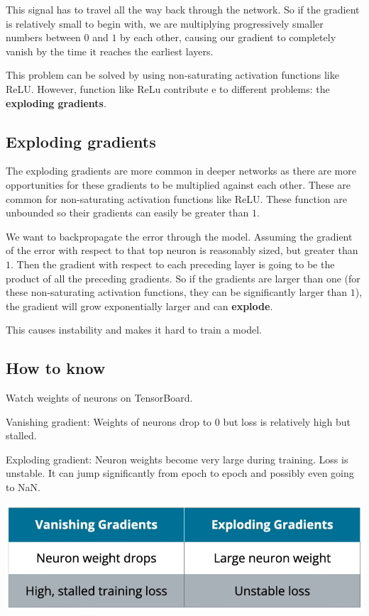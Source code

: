 This signal has to travel all the way back through the network. So if the gradient is relatively small to begin with, we are multiplying progressively smaller numbers between \(0\) and \(1\) by each other, causing our gradient to completely vanish by the time it reaches the earliest layers. 

This problem can be solved by using non-saturating activation functions like ReLU.  However, function like ReLu contribute e to different problems: the \textbf{exploding gradients}.

\subsection{Exploding gradients}
The exploding gradients are more common in deeper networks as there are more opportunities for these gradients to be multiplied against each other. These are common for non-saturating activation functions like ReLU. These function are unbounded so their gradients can easily be greater than \(1\).  \newline

We want to backpropagate the error through the model. Assuming the gradient of the error with respect to that top neuron is reasonably sized, but greater than \(1\). Then the gradient with respect to each preceding layer is going to be the product of all the preceding gradients. So if the gradients are larger than one (for these non-saturating activation functions, they can be significantly larger than \(1\)), the gradient will grow exponentially larger and can \textbf{explode}. \newline

This causes instability and makes it hard to train a model. 
\subsection{How to know}
Watch weights of neurons on TensorBoard. \newline

Vanishing gradient: Weights of neurons drop to 0 but loss is relatively high but stalled. \newline

Exploding gradient: Neuron weights become very large during training. Loss is unstable. It can jump significantly from epoch to epoch and possibly even going to NaN.

\includegraphics[width=0.75\linewidth]{image.png}

